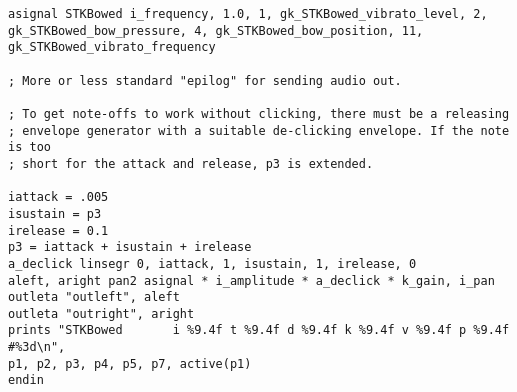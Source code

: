 \documentclass[12pt,letterpaper,onecolumn]{scrartcl}
\begin{document}
\begin{lstlisting}
asignal STKBowed i_frequency, 1.0, 1, gk_STKBowed_vibrato_level, 2, gk_STKBowed_bow_pressure, 4, gk_STKBowed_bow_position, 11, gk_STKBowed_vibrato_frequency

; More or less standard "epilog" for sending audio out.

; To get note-offs to work without clicking, there must be a releasing 
; envelope generator with a suitable de-clicking envelope. If the note is too 
; short for the attack and release, p3 is extended.

iattack = .005
isustain = p3
irelease = 0.1
p3 = iattack + isustain + irelease
a_declick linsegr 0, iattack, 1, isustain, 1, irelease, 0
aleft, aright pan2 asignal * i_amplitude * a_declick * k_gain, i_pan
outleta "outleft", aleft
outleta "outright", aright
prints "STKBowed       i %9.4f t %9.4f d %9.4f k %9.4f v %9.4f p %9.4f #%3d\n", 
p1, p2, p3, p4, p5, p7, active(p1)
endin

\end{lstlisting}
\end{document}
